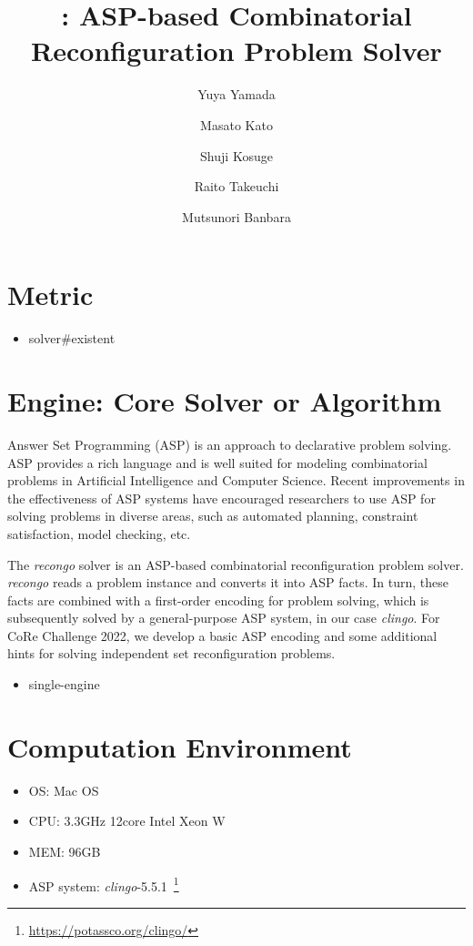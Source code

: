 \documentclass[a4paper,dvipdfmx]{article}
\date{}
\title{{\recongo}: ASP-based Combinatorial Reconfiguration Problem Solver}
\author[1]{Yuya Yamada}
\author[2]{Masato Kato}
\author[2]{Shuji Kosuge}
\author[1]{Raito Takeuchi}
\author[1]{Mutsunori Banbara}
\affil[1]{Graduate School of Informatics, Nagoya University, Japan}
\affil[2]{School of Informatics, Nagoya University, Japan}
\newcommand{\clingo}{\textit{clingo}}
\newcommand{\recongo}{\textit{recongo}}
\begin{document}
\maketitle

\section{Metric}
\begin{itemize}
  \item solver{\#}existent
\end{itemize}

\section{Engine: Core Solver or Algorithm}
Answer Set Programming (ASP) is an approach to declarative problem solving.
ASP provides a rich language and 
is well suited for modeling combinatorial problems 
in Artificial Intelligence and Computer Science.
Recent improvements in the effectiveness of ASP systems
have encouraged researchers to use ASP for solving problems in diverse
areas, such as
automated planning,
constraint satisfaction,
model checking, etc.

The {\recongo} solver is an ASP-based combinatorial reconfiguration
problem solver.
{\recongo} reads a problem instance and converts it into ASP facts.
In turn, these facts are combined with a first-order encoding for
problem solving, which is subsequently solved by a general-purpose ASP
system, in our case {\clingo}.
For CoRe Challenge 2022, we develop a basic ASP encoding and some
additional hints for solving independent set reconfiguration problems.

\begin{itemize}
\item single-engine
\end{itemize}

\section{Computation Environment}
\begin{itemize}
\item OS: Mac OS
\item CPU: 3.3GHz 12core Intel Xeon W
\item MEM: 96GB
\item ASP system: {\clingo}-5.5.1~\footnote{\url{https://potassco.org/clingo/}}
\end{itemize}
\end{document}
